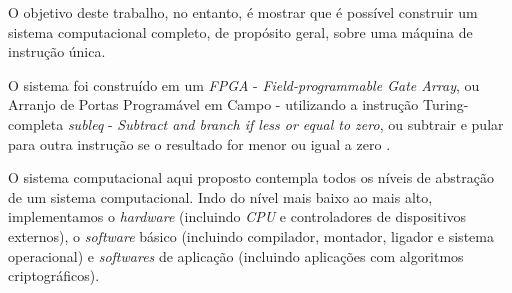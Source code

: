 O objetivo deste trabalho, no entanto, é mostrar que é possível construir um
sistema computacional completo, de propósito geral, sobre uma máquina de
instrução única.

O sistema foi construído em um \textit{FPGA} - \textit{Field-programmable Gate
  Array}, ou Arranjo de Portas Programável em Campo \cite{brant2012zuma} -
utilizando a instrução Turing-completa \textit{subleq} - \textit{Subtract and
  branch if less or equal to zero}, ou subtrair e pular para outra instrução se
o resultado for menor ou igual a zero \cite{subleq}.

O sistema computacional aqui proposto contempla todos os níveis de abstração de
um sistema computacional. Indo do nível mais baixo ao mais alto, implementamos o
\textit{hardware} (incluindo \textit{CPU} e controladores de dispositivos
externos), o \textit{software} básico (incluindo compilador, montador, ligador e
sistema operacional) e \textit{softwares} de aplicação (incluindo aplicações com
algoritmos criptográficos).

